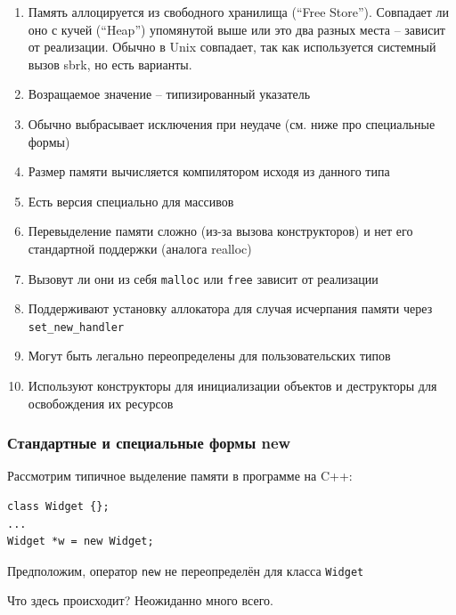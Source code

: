 \documentclass[a4paper,12pt,oneside]{article}
\begin{document}
\begin{enumerate}
\item
Память аллоцируется из свободного хранилища (``Free Store''). Совпадает ли оно с кучей (``Heap'') упомянутой выше или это два разных места -- зависит от реализации. Обычно в Unix совпадает, так как используется системный вызов sbrk, но есть варианты.
\item
Возращаемое значение -- типизированный указатель
\item
Обычно выбрасывает исключения при неудаче (см. ниже про специальные формы)
\item
Размер памяти вычисляется компилятором исходя из данного типа
\item
Есть версия специально для массивов
\item
Перевыделение памяти сложно (из-за вызова конструкторов) и нет его стандартной поддержки (аналога realloc)
\item
Вызовут ли они из себя \lstinline!malloc! или \lstinline!free! зависит от реализации
\item
Поддерживают установку аллокатора для случая исчерпания памяти через \lstinline!set_new_handler!
\item
Могут быть легально переопределены для пользовательских типов
\item
Используют конструкторы для инициализации объектов и деструкторы для освобождения их ресурсов
\end{enumerate}

\subsubsection{Стандартные и специальные формы new}\label{subsub:placementnew}

Рассмотрим типичное выделение памяти в программе на C++:

\begin{lstlisting}
class Widget {};
...
Widget *w = new Widget;
\end{lstlisting}

Предположим, оператор \lstinline!new! не переопределён для класса \lstinline!Widget!

Что здесь происходит? Неожиданно много всего.
\end{document}
